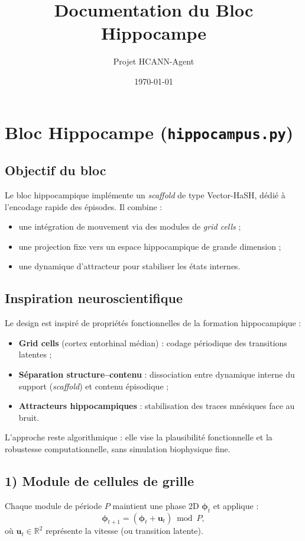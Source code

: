 \documentclass[12pt,a4paper]{article}
\title{Documentation du Bloc Hippocampe}
\author{Projet HCANN-Agent}
\date{\today}
\begin{document}
\maketitle

\section{Bloc Hippocampe (\texttt{hippocampus.py})}

\subsection{Objectif du bloc}
Le bloc hippocampique implémente un \textit{scaffold} de type Vector-HaSH, dédié à l'encodage rapide des épisodes. Il combine :
\begin{itemize}
    \item une intégration de mouvement via des modules de \textit{grid cells} ;
    \item une projection fixe vers un espace hippocampique de grande dimension ;
    \item une dynamique d'attracteur pour stabiliser les états internes.
\end{itemize}

\subsection{Inspiration neuroscientifique}
Le design est inspiré de propriétés fonctionnelles de la formation hippocampique :
\begin{itemize}
    \item \textbf{Grid cells} (cortex entorhinal médian) : codage périodique des transitions latentes ;
    \item \textbf{Séparation structure--contenu} : dissociation entre dynamique interne du support (\textit{scaffold}) et contenu épisodique ;
    \item \textbf{Attracteurs hippocampiques} : stabilisation des traces mnésiques face au bruit.
\end{itemize}
L'approche reste algorithmique : elle vise la plausibilité fonctionnelle et la robustesse computationnelle, sans simulation biophysique fine.

\subsection{1) Module de cellules de grille}
Chaque module de période $P$ maintient une phase 2D $\boldsymbol{\phi}_t$ et applique :
\begin{equation}
\boldsymbol{\phi}_{t+1} = (\boldsymbol{\phi}_t + \mathbf{u}_t)\bmod P,
\end{equation}
où $\mathbf{u}_t\in\mathbb{R}^2$ représente la vitesse (ou transition latente).
\end{document}
